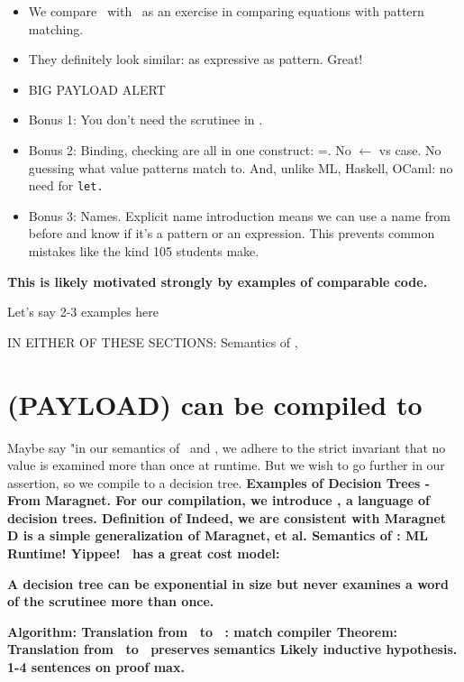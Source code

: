 \documentclass[manuscript,screen,review, 12pt]{acmart}
\begin{document}
\begin{outline}[enumerate]
    \begin{itemize}
        \item We compare \VMinus\ with \PPlus\ as an exercise in comparing
        equations with pattern matching. 
        \item They definitely look similar: as expressive as pattern. Great! 
        \item{BIG PAYLOAD ALERT}
        \item Bonus 1: You don't need the scrutinee in \VMinus. 
        \item Bonus 2: Binding, checking are all in one construct: =. No
                $\leftarrow$ vs case. No guessing what value patterns match to. 
                And, unlike ML, Haskell, OCaml: no need for \tt{let}.
        \item Bonus 3: Names. Explicit name introduction means we can use a name
        from before and know if it's a pattern or an expression. This prevents
        common mistakes like the kind 105 students make. 
    \end{itemize}
    

    \3 \bf{\bf{This is likely motivated strongly by examples of comparable code.}}

    \4 Let's say 2-3 examples here

    \end{outline}

IN EITHER OF THESE SECTIONS: Semantics of \PPlus, \VMinus

\section{(PAYLOAD) {\VMinus} can be compiled to }
\begin{outline}[enumerate]
    \1 Maybe say "in our semantics of \PPlus\ and \VMinus, we adhere to the
    strict invariant that no value is examined more than once at runtime. But we wish to go further in our assertion, 
    so we compile \VMinus to a decision tree. 
    \1 \bf{Examples of Decision Trees - From Maragnet. }
    \1 For our compilation, we introduce \D, a language of decision trees. 
    \1 \bf{Definition of \D}
    \2 \bf{Indeed, we are consistent with Maragnet }
    \1 \bf{D is a simple generalization of Maragnet, et al. }
    \1 \bf{Semantics of \D: ML Runtime! Yippee!}
    \1 \bf{\D\ has a great cost model: }

    \bf{A decision tree can be exponential in size but never examines a word of
    the scrutinee more than once. }

    \1 \bf{Algorithm: Translation from \VMinus\ to \D\ : match compiler }
    \1 \bf{Theorem: Translation from \VMinus\ to \D\ preserves semantics }
    \2 \bf{Likely inductive hypothesis. 1-4 sentences on proof max. }
\end{outline}
\end{document}
